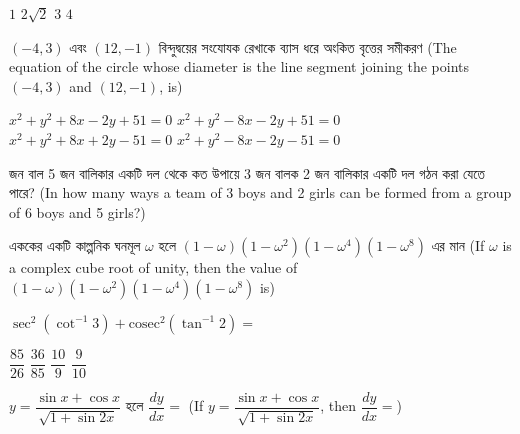 \documentclass[addpoints]{exam}
\begin{document}
\begin{questions}
\begin{oneparchoices}
\choice $ 1 $
\choice $ 2\sqrt{2} $
\choice $ 3 $
\choice $ 4 $

\end{oneparchoices}

\question  $ (-4,3) $ এবং $ (12,-1) $ বিন্দুদ্বয়ের সংযোযক রেখাকে ব্যাস ধরে অংকিত বৃত্তের সমীকরণ (The equation of the circle whose diameter is the line segment joining the points $ (-4,3) $ and $ (12,-1) $, is)

\begin{oneparchoices}
\choice $ x^{2} + y^{2}+8x-2y+51=0 $
\hspace*{.5cm} \choice $ x^{2} + y^{2}-8x-2y+51=0 $\\
\hspace*{-.45cm} \choice $ x^{2} + y^{2}+8x+2y-51=0 $
\hspace*{.5cm} \choice $ x^{2} + y^{2}-8x-2y-51=0 $
\end{oneparchoices}

 জন বাল 5 জন বালিকার একটি দল থেকে কত উপায়ে 3 জন বালক 2 জন বালিকার একটি দল গঠন করা যেতে পারে? (In how many ways a team of 3 boys and 2 girls can be formed from a group of 6 boys and 5 girls?)

\begin{oneparchoices}

\end{oneparchoices}

\question    এককের একটি কাল্পনিক ঘনমূল $ \omega $ হলে $ (1-\omega)(1-\omega^{2})(1-\omega^{4})(1-\omega^{8}) $ এর মান (If $ \omega $ is a complex cube root of unity, then the value of $ (1-\omega)(1-\omega^{2})(1-\omega^{4})(1-\omega^{8}) $ is) 

\begin{oneparchoices}

\end{oneparchoices}

\question  $ \sec^{2}(\cot^{-1}3) +\text{cosec}^{2}(\tan^{-1}2) = $

\begin{oneparchoices}
\choice $ \dfrac{85}{26} $
\choice $ \dfrac{36}{85} $
\choice $ \dfrac{10}{9} $
\choice  $ \dfrac{9}{10} $

\end{oneparchoices}

\question  $ y=\dfrac{\sin x + \cos x}{\sqrt{1+\sin 2x}} $ হলে $ \dfrac{dy}{dx} = $ (If $ y=\dfrac{\sin x + \cos x}{\sqrt{1+\sin 2x}} $, then  $ \dfrac{dy}{dx} = $)


\end{questions}
\end{document}
